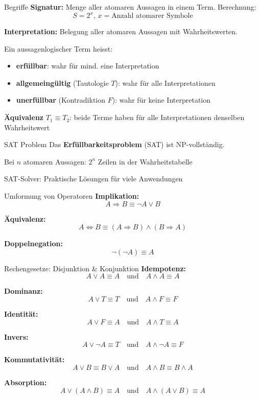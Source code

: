 \documentclass[a4paper, fontsize=7pt]{scrartcl}
\begin{document}
\begin{mainbox}{Begriffe}
\textbf{Signatur:} Menge aller atomaren Aussagen in einem Term. Berechnung:
\[S = 2^x \text{, } x = \text{Anzahl atomarer Symbole}\]

\textbf{Interpretation:} Belegung aller atomaren Aussagen mit Wahrheitswerten.

Ein aussagenlogischer Term heisst:
\begin{itemize}
    \item \textbf{erfüllbar}: wahr für mind. eine Interpretation
    \item \textbf{allgemeingültig} (Tautologie $T$): wahr für alle Interpretationen
    \item \textbf{unerfüllbar} (Kontradiktion $F$): wahr für keine Interpretation
\end{itemize}

\textbf{Äquivalenz} $T_1 \equiv T_2$: beide Terme haben für alle Interpretationen denselben Wahrheitswert
\end{mainbox}

\begin{subbox}{SAT Problem}
Das \textbf{Erfüllbarkeitsproblem} (SAT) ist NP-vollständig.

Bei $n$ atomaren Aussagen: $2^n$ Zeilen in der Wahrheitstabelle

SAT-Solver: Praktische Lösungen für viele Anwendungen
\end{subbox}

\begin{mainbox}{Umformung von Operatoren}
\textbf{Implikation:}
\[A \Rightarrow B \equiv \neg A \lor B\]

\textbf{Äquivalenz:}
\[A \Leftrightarrow B \equiv (A \Rightarrow B) \land (B \Rightarrow A)\]

\textbf{Doppelnegation:}
\[\neg(\neg A) \equiv A\]
\end{mainbox}

\begin{mainbox}{Rechengesetze: Disjunktion \& Konjunktion}
\textbf{Idempotenz:}
$$A \lor A \equiv A \quad \text{und} \quad A \land A \equiv A$$

\textbf{Dominanz:}
$$A \lor T \equiv T \quad \text{und} \quad A \land F \equiv F$$

\textbf{Identität:}
$$A \lor F \equiv A \quad \text{und} \quad A \land T \equiv A$$

\textbf{Invers:}
$$A \lor \neg A \equiv T \quad \text{und} \quad A \land \neg A \equiv F$$

\textbf{Kommutativität:}
$$A \lor B \equiv B \lor A \quad \text{und} \quad A \land B \equiv B \land A$$

\textbf{Absorption:}
$$A \lor (A \land B) \equiv A \quad \text{und} \quad A \land (A \lor B) \equiv A$$
\end{mainbox}
\end{document}
